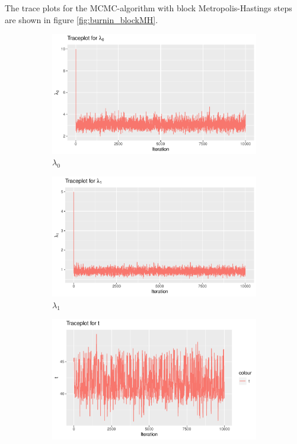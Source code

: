 
The trace plots for the MCMC-algorithm with block Metropolis-Hastings steps are shown in figure \ref{fig:burnin_blockMH}. 

\begin{figure}[h]
    \centering
    \begin{subfigure}[b]{0.49\textwidth}
        \centering
        \includegraphics[width = \textwidth]{Images/block_sim_lambda0.pdf}
        \caption{$\lambda_0$}
        \label{fig:block_burnin_lam0}
    \end{subfigure}
    \begin{subfigure}[b]{0.49\textwidth}
        \centering
        \includegraphics[width = \textwidth]{Images/block_sim_lambda1.pdf}
        \caption{$\lambda_1$}
        \label{fig:block_burnin_lam1}
    \end{subfigure}
    \begin{subfigure}[b]{0.49\textwidth}
        \centering
        \includegraphics[width = \textwidth]{Images/block_sim_t.pdf}

\end{subfigure}
\end{figure}
